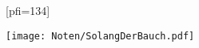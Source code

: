 [pfi={134}]

\texttt{[image: Noten/SolangDerBauch.pdf]}

\endsong

\beginscripture{}~\\
\endscripture
